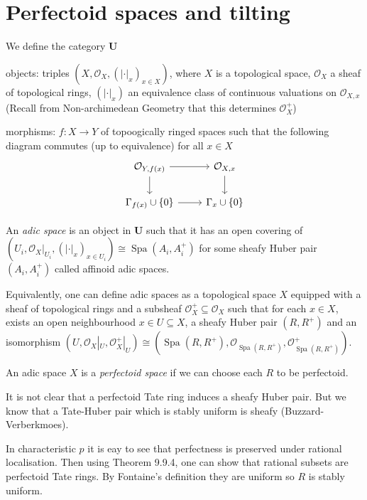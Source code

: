 \documentclass[a4paper]{article}
\renewcommand{\c}[1]{\mathbf{#1}}
\newcommand{\sh}[1]{\mathcal{#1}} %
\DeclareMathOperator{\Spa}{Spa}
\newcommand{\sh}[1]{\mathcal{#1}} %
\DeclareMathOperator{\Spa}{Spa}
\begin{document}
\section{Perfectoid spaces and tilting}

\begin{definition}
  We define the category \(\c U\)
  
  objects: triples \((X, \sh O_X, (|\cdot|_x)_{x \in X})\), where \(X\) is a topological space, \(\sh O_X\) a sheaf of topological rings, \((|\cdot|_x)\) an equivalence class of continuous valuations on \(\sh O_{X, x}\) (Recall from Non-archimedean Geometry that this determines \(\sh O_X^+\))

  morphisms: \(f: X \to Y\) of topoogically ringed spaces such that the following diagram commutes (up to equivalence) for all \(x \in X\)
  \[
    \begin{tikzcd}
      \sh O_{Y, f(x)} \ar[r] \ar[d] & \sh O_{X, x} \ar[d] \\
      \Gamma_{f(x)} \cup \{0\} \ar[r] & \Gamma_x \cup \{0\}
    \end{tikzcd}
  \]

  An \emph{adic space} is an object in \(\c U\) such that it has an open covering of \((U_i, \sh O_X|_{U_i}, (|\cdot|_x)_{x \in U_i}) \cong \Spa(A_i, A_i^+)\) for some sheafy Huber pair \((A_i, A_i^+)\) called affinoid adic spaces.

  Equivalently, one can define adic spaces as a topological space \(X\) equipped with a sheaf of topological rings and a subsheaf \(\sh O_X^+ \subseteq \sh O_X\) such that for each \(x \in X\), exists an open neighbourhood \(x \in U \subseteq X\), a sheafy Huber pair \((R, R^+)\) and an isomorphism \((U, \sh O_X|_U, \sh O_X^+|_U) \cong (\Spa(R, R^+), \sh O_{\Spa(R, R^+)}, \sh O^+_{\Spa(R, R^+)})\).
\end{definition}

\begin{definition}
  An adic space \(X\) is a \emph{perfectoid space} if we can choose each \(R\) to be perfectoid.
\end{definition}

\begin{remark}
  It is not clear that a perfectoid Tate ring induces a sheafy Huber pair. But we know that a Tate-Huber pair which is stably uniform is sheafy (Buzzard-Verberkmoes).

  In characteristic \(p\) it is eay to see that perfectness is preserved under rational localisation. Then using Theorem 9.9.4, one can show that rational subsets are perfectoid Tate rings. By Fontaine's definition they are uniform so \(R\) is stably uniform.
\end{remark}
\end{document}
